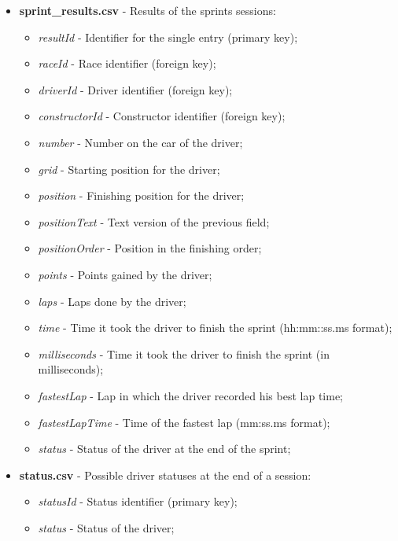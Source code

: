 \documentclass{Configuration_Files/PoliMi3i_thesis}
\begin{document}
\begin{itemize}
    \item \textbf{sprint\_results.csv} - Results of the sprints sessions:
    \begin{itemize}
        \item \textit{resultId} - Identifier for the single entry (primary key);
        \item \textit{raceId} - Race identifier (foreign key);
        \item \textit{driverId} - Driver identifier (foreign key);
        \item \textit{constructorId} - Constructor identifier (foreign key);
        \item \textit{number} - Number on the car of the driver;
        \item \textit{grid} - Starting position for the driver;
        \item \textit{position} - Finishing position for the driver;
        \item \textit{positionText} - Text version of the previous field;
        \item \textit{positionOrder} - Position in the finishing order;
        \item \textit{points} - Points gained by the driver;
        \item \textit{laps} - Laps done by the driver;
        \item \textit{time} - Time it took the driver to finish the sprint (hh:mm::ss.ms format);
        \item \textit{milliseconds} - Time it took the driver to finish the sprint (in milliseconds);
        \item \textit{fastestLap} - Lap in which the driver recorded his best lap time;
        \item \textit{fastestLapTime} - Time of the fastest lap (mm:ss.ms format);
        \item \textit{status} - Status of the driver at the end of the sprint;
    \end{itemize}

    \item \textbf{status.csv} - Possible driver statuses at the end of a session:
    \begin{itemize}
        \item \textit{statusId} - Status identifier (primary key);
        \item \textit{status} - Status of the driver;
    \end{itemize}
\end{itemize}
\end{document}
